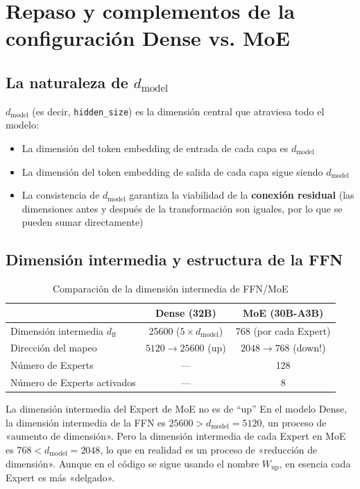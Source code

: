 \documentclass[a4paper]{article}
\begin{document}
\section{Repaso y complementos de la configuración Dense vs. MoE}

\subsection{La naturaleza de $d_{\text{model}}$}

$d_{\text{model}}$ (es decir, \texttt{hidden\_size}) es la dimensión central que atraviesa todo el modelo:
\begin{itemize}
  \item La dimensión del token embedding de entrada de cada capa es $d_{\text{model}}$
  \item La dimensión del token embedding de salida de cada capa sigue siendo $d_{\text{model}}$
  \item La consistencia de $d_{\text{model}}$ garantiza la viabilidad de la \textbf{conexión residual} (las dimensiones antes y después de la transformación son iguales, por lo que se pueden sumar directamente)
\end{itemize}

\subsection{Dimensión intermedia y estructura de la FFN}

\begin{table}[H]
\centering
\caption{Comparación de la dimensión intermedia de FFN/MoE}
\begin{tabular}{lcc}
\toprule
& \textbf{Dense (32B)} & \textbf{MoE (30B-A3B)} \\
\midrule
Dimensión intermedia $d_{\text{ff}}$ & 25600 ($5 \times d_{\text{model}}$) & 768 (por cada Expert) \\
Dirección del mapeo & $5120 \to 25600$ (up) & $2048 \to 768$ (down!) \\
Número de Experts & --- & 128 \\
Número de Experts activados & --- & 8 \\
\bottomrule
\end{tabular}
\end{table}

\begin{warningbox}{La dimensión intermedia del Expert de MoE no es de ``up''}
En el modelo Dense, la dimensión intermedia de la FFN es $25600 > d_{\text{model}} = 5120$, un proceso de «aumento de dimensión». Pero la dimensión intermedia de cada Expert en MoE es $768 < d_{\text{model}} = 2048$, lo que en realidad es un proceso de «reducción de dimensión». Aunque en el código se sigue usando el nombre $W_{\text{up}}$, en esencia cada Expert es más «delgado».
\end{warningbox}
\end{document}
